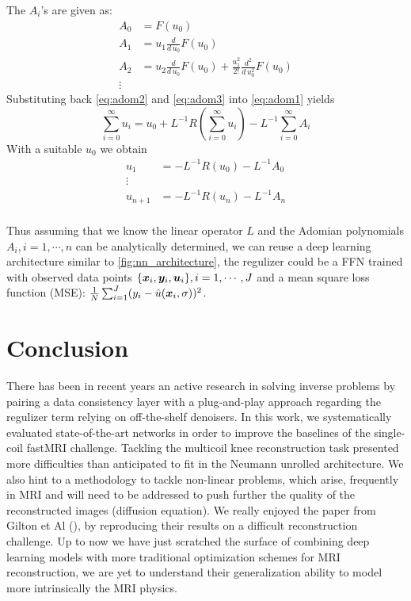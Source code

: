 \documentclass{article}
\begin{document}
The $A_i$'s are given as:
\begin{align*}
	A_0	&=	F(u_0) \\
	A_1	&=	u_1 \frac{d}{d \, u_0} F(u_0) \\
	A_2	&=	u_2 \frac{d}{d \, u_0} F(u_0) + \frac{u_1^2}{2!}  \frac{d^2}{d \, u_0^2} F(u_0)  \\
	\vdots
\end{align*}
Substituting back \eqref{eq:adom2} and \eqref{eq:adom3} into \eqref{eq:adom1} yields
\begin{equation}
	 \sum_{i=0}^\infty u_i  =  u_0  + L^{-1} R( \sum_{i=0}^\infty u_i) -   L^{-1}    \sum_{i=0}^\infty  A_i \label{eq:adom4}
\end{equation}	
With a suitable $u_0$ we obtain
\begin{align*}
	u_1 			&=	-L^{-1} R(u_0) - L^{-1} A_0 \\
	\vdots \\
	u_{n+1} 		&=  -L^{-1} R(u_n) - L^{-1} A_n \\
\end{align*}

Thus assuming that we know the linear operator $L$ and  the Adomian polynomials $A_i, i=1,\cdots,n$ can be analytically determined, we can reuse a deep learning architecture similar to \ref{fig:nn_architecture}, the regulizer could be a FFN trained with observed data points $\{\bm{x}_i, \bm{y}_i, \bm{u}_i\}, i=1,\cdots,J$ and a mean square loss function (MSE): $\frac{1}{N} \sum_{i=1}^J (y_i - \hat{u}(\bm{x}_i, \sigma))^2$. 

\section{Conclusion}
There has been in recent years an active research in solving inverse problems by pairing a data consistency layer with a plug-and-play approach regarding the regulizer term relying on off-the-shelf denoisers. In this work, we systematically evaluated state-of-the-art networks in order to improve the baselines of the single-coil fastMRI challenge. Tackling the multicoil knee reconstruction task presented more difficulties than anticipated to fit in the Neumann unrolled architecture. We also hint to a methodology to tackle non-linear problems, which arise, frequently in MRI and will need to be addressed  to push further the quality of the reconstructed images (diffusion equation). We really enjoyed the paper from Gilton et Al (\cite{DBLP:journals/corr/abs-1901-03707}), by reproducing their results on a difficult reconstruction challenge. Up to now we have just scratched the surface of combining deep learning models with more traditional optimization schemes for MRI reconstruction, we are yet to understand their generalization ability to model more intrinsically the MRI physics.
\end{document}
